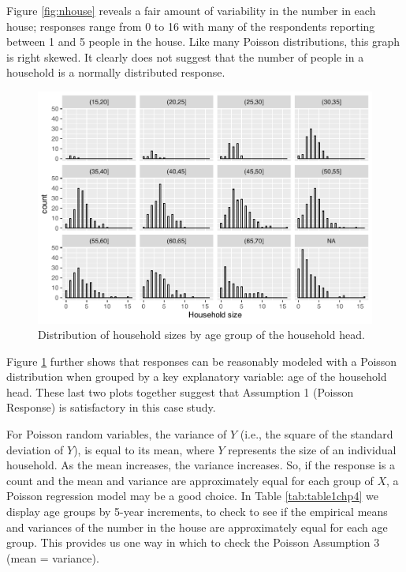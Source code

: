 \documentclass[
]{krantz}
\begin{document}
Figure \ref{fig:nhouse} reveals a fair amount of variability in the number in each house; responses range from 0 to 16 with many of the respondents reporting between 1 and 5 people in the house. Like many Poisson distributions, this graph is right skewed. It clearly does not suggest that the number of people in a household is a normally distributed response.

\begin{figure}

{\centering \includegraphics[width=0.6\linewidth]{bookdown-BeyondMLR_files/figure-latex/totalPoisByAge-1} 

}

\caption{Distribution of household sizes by age group of the household head.}\label{fig:totalPoisByAge}
\end{figure}

Figure \ref{fig:totalPoisByAge} further shows that responses can be reasonably modeled with a Poisson distribution when grouped by a key explanatory variable: age of the household head. These last two plots together suggest that Assumption 1 (Poisson Response) is satisfactory in this case study.

For Poisson random variables, the variance of \(Y\) (i.e., the square of the standard deviation of \(Y\)), is equal to its mean, where \(Y\) represents the size of an individual household. As the mean increases, the variance increases. So, if the response is a count and the mean and variance are approximately equal for each group of \(X\), a Poisson regression model may be a good choice. In Table \ref{tab:table1chp4} we display age groups by 5-year increments, to check to see if the empirical means and variances of the number in the house are approximately equal for each age group. This provides us one way in which to check the Poisson Assumption 3 (mean = variance).
\end{document}
